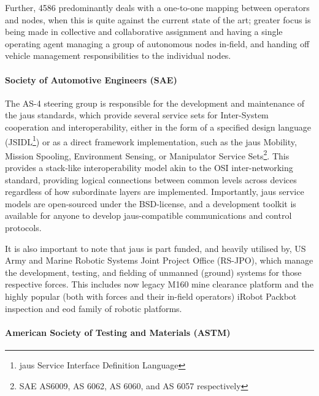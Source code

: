  
 
 Further, 4586 predominantly deals with a one-to-one mapping between operators and nodes, when this is quite against the current state of the art; greater focus is being made in collective and collaborative assignment and having a single operating agent managing a group of autonomous nodes in-field, and handing off vehicle management responsibilities to the individual nodes.
 
 \paragraph{Society of Automotive Engineers (SAE)}
 
 The AS-4 steering group is responsible for the development and maintenance of the \acrfull{jaus} standards, which provide several service sets for Inter-System cooperation and interoperability, either in the form of a specified design language (JSIDL\footnote{\acrshort{jaus} Service Interface Definition Language}) or as a direct framework implementation, such as the \acrshort{jaus} Mobility, Mission Spooling, Environment Sensing, or Manipulator Service Sets\footnote{SAE AS6009, AS 6062, AS 6060, and AS 6057 respectively}.
 This provides a stack-like interoperability model akin to the OSI inter-networking standard, providing logical connections between common levels across devices regardless of how subordinate layers are implemented.
 Importantly, \acrshort{jaus} service models are open-sourced under the BSD-license, and a development toolkit is available for anyone to develop \acrshort{jaus}-compatible communications and control protocols\cite{JTS}.

 It is also important to note that \acrshort{jaus} is part funded, and heavily utilised by, US Army and Marine Robotic Systems Joint Project Office (RS-JPO), which manage the development, testing, and fielding of unmanned (ground) systems for those respective forces.
 This includes now legacy M160 mine clearance platform and the highly popular (both with forces and their in-field operators) iRobot Packbot inspection and \acrfull{eod} family of robotic platforms.
 
 \paragraph{American Society of Testing and Materials (ASTM)}
 
